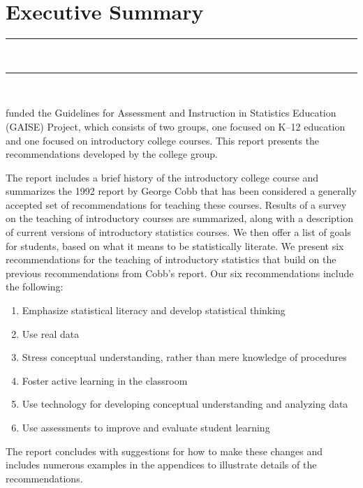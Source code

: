 
\clearpage
\chapter{Executive Summary}
\vspace{-.53in}
   \noindent\color{graylight}\rule[0cm]{3.25in}{0.03cm} \\
    \noindent\color{graylight}\rule[0.4cm]{3.25in}{0.03cm} \\
\color{black}
\vspace{.05in}

 funded the Guidelines for Assessment and Instruction in Statistics Education (GAISE) Project, which consists of two groups, one focused on K--12 education and one focused on introductory college courses. This report presents the recommendations developed by the college group. 

The report includes a brief history of the introductory college course and summarizes the 1992 report\cite{cobb1} by George Cobb that has been considered a generally accepted set of recommendations for teaching these courses. Results of a survey on the teaching of introductory courses are summarized, along with a description of current versions of introductory statistics courses. We then offer a list of goals for students, based on what it means to be statistically literate. We present six recommendations for the teaching of introductory statistics that build on the previous recommendations from Cobb's report. Our six recommendations include the following:

\begin{enumerate}[leftmargin=1cm, itemsep=.2em]
\item Emphasize statistical literacy and develop statistical thinking
\item Use real data
\item Stress conceptual understanding, rather than mere knowledge of procedures
\item Foster active learning in the classroom
\item Use technology for developing conceptual understanding and analyzing data
\item Use assessments to improve and evaluate student learning
\end{enumerate}

The report concludes with suggestions for how to make these changes and includes numerous examples in the appendices to illustrate details of the recommendations.


